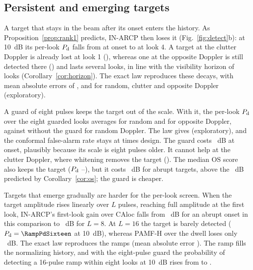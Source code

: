 \documentclass[journal]{IEEEtran}
\begin{document}
\subsection{Persistent and emerging targets}\label{sec:onset}
A target that stays in the beam after its onset enters the history. As Proposition~\ref{prop:rank1} predicts, IN-ARCP then loses it (Fig.~\ref{fig:detect}b): at 10~dB its per-look $P_{\rm d}$ falls from \OnLookZero{} at onset to \OnLookFour{} at look 4. A target at the clutter Doppler is already lost at look 1 (\OnMatchedOne), whereas one at the opposite Doppler is still detected there (\OnOppOne) and lasts several looks, in line with the visibility horizon of \ThHorizonOpp{} looks (Corollary~\ref{cor:horizon}). The exact law reproduces these decays, with mean absolute errors of \OnTheoryMaeRand, \OnTheoryMaeMatch{} and \OnTheoryMaeOpp{} for random, clutter and opposite Doppler (exploratory).

A guard of eight pulses keeps the target out of the scale. With it, the per-look $P_{\rm d}$ over the eight guarded looks averages \GuardMeanLookEight{} for random and \GuardOppEight{} for opposite Doppler, against \GuardMeanLookZero{} without the guard for random Doppler. The law gives \GuardLawEight{} (exploratory), and the conformal false-alarm rate stays at \GuardPfaEight{} times design. The guard costs \GuardOnsetCost~dB at onset, plausibly because its scale is eight pulses older. It cannot help at the clutter Doppler, where whitening removes the target (\GuardMatchedEight). The median OS score also keeps the target ($P_{\rm d}$ \OsPersFirst--\OsPersLast), but it costs \OsCostEight~dB for abrupt targets, above the \OSLossEight~dB predicted by Corollary~\ref{cor:os}; the guard is cheaper.

Targets that emerge gradually are harder for the per-look screen. When the target amplitude rises linearly over $L$ pulses, reaching full amplitude at the first look, IN-ARCP's first-look gain over CAloc falls from \RampGainOne~dB for an abrupt onset in this comparison to \RampGainEight~dB for $L=8$. At $L=16$ the target is barely detected ($P_{\rm d}=\RampPdSixteen$ at 10~dB), whereas PAMF-H over the dwell loses only \RampPAMFLoss~dB. The exact law reproduces the ramps (mean absolute error \RampMae). The ramp fills the normalizing history, and with the eight-pulse guard the probability of detecting a 16-pulse ramp within eight looks at 10~dB rises from \GuardRampZero{} to \GuardRampEight.
\end{document}
